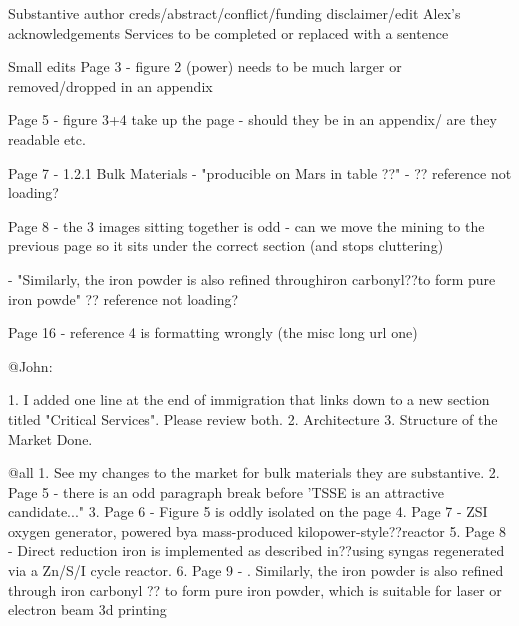 
Substantive
author creds/abstract/conflict/funding disclaimer/edit Alex's acknowledgements 
Services to be completed or replaced with a sentence

Small edits
Page 3 - figure 2 (power) needs to be much larger or removed/dropped
in an appendix

Page 5 - figure 3+4 take up the page - should they be in an appendix/
are they readable etc.

Page 7 - 1.2.1 Bulk Materials - "producible on Mars in table ??" - ?? reference not loading?

Page 8 - the 3 images sitting together is odd - can we move the mining to 
the previous page so it sits under the correct section (and stops cluttering)

    - "Similarly, the iron powder is also refined throughiron carbonyl??to form pure iron powde" ?? reference not loading?

Page 16 - reference 4 is formatting wrongly (the misc long url one) 

@John:

1. I added one line at the end of immigration that links down to a new section titled "Critical Services". Please review both.
2. Architecture
3. Structure of the Market
Done.

@all
1. See my changes to the market for bulk materials they are substantive.
2. Page 5 - there is an odd paragraph break before 'TSSE is an attractive candidate..."
3. Page 6 - Figure 5 is oddly isolated on the page 
4. Page 7 - ZSI oxygen generator, powered bya mass-produced kilopower-style??reactor
5. Page 8 - Direct reduction iron is implemented as described in??using syngas regenerated via a Zn/S/I cycle reactor. 
6. Page 9 - . Similarly, the iron powder is also refined through
iron carbonyl ?? to form pure iron powder, which is suitable
for laser or electron beam 3d printing